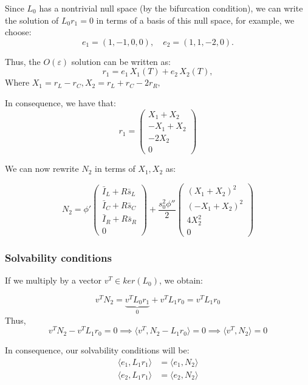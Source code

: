 \documentclass[ENG]{fancynotes}
\begin{document}
Since \(L_0\) has a nontrivial null space (by the bifurcation condition), we can write the solution of $L_0r_1 = 0$  in terms of a basis of this null space, for example, we choose:
\[
e_1 = (1, -1, 0, 0), \quad e_2 = (1, 1, -2, 0).
\]

Thus, the $O(\varepsilon)$ solution can be written as:
\[
r_1 = e_1\,X_1(T) + e_2\,X_2(T),
\]
Where $X_1 = r_L-r_C, X_2 =  r_L+r_C-2r_R, $

In consequence, we have that:
 \[
r_{1} = \begin{pmatrix}X_1+X_2\\-X_1+X_2\\-2X_2\\0 \end{pmatrix} 
\]


We can now rewrite $N_2$ in terms of $X_1, X_2$ as:

\[
N_2 = \phi'\begin{pmatrix}
\bar{I}_L + R\bar{s}_L  \\
\bar{I}_C  + R\bar{s}_C \\ 
\bar{I}_R + R\bar{s}_R \\ 
0
\end{pmatrix} + \frac{s_0^2 \phi''}{2} 
\begin{pmatrix}
(X_1 +X_2)^2\\  
(-X_1 + X_2)^2\\  
4X_2^2\\ 
0
\end{pmatrix}
\]

\subsubsection{Solvability conditions}
If we multiply by a vector  $v^T  \in ker(L_0)$, we obtain:

$$
v^T N_2 = \underbrace{v^T L_0 r_1}_0 + v^T L_1 r_0 = v^T L_1 r_0
$$
Thus, 
$$
v^T N_2 - v^T L_1 r_0 = 0 \implies \langle v^T,  N_2 - L_1 r_0\rangle = 0 \implies \langle v^T,  N_2 \rangle = 0 
$$

In consequence, our solvability conditions will be:
\begin{equation}
\begin{aligned}
    \langle e_1, L_1 r_1 \rangle &= \langle e_1, N_2 \rangle \\
    \langle e_2, L_1 r_1 \rangle &= \langle e_2, N_2 \rangle
\end{aligned}
 \label{eq:solvability1}
\end{equation}
\end{document}

